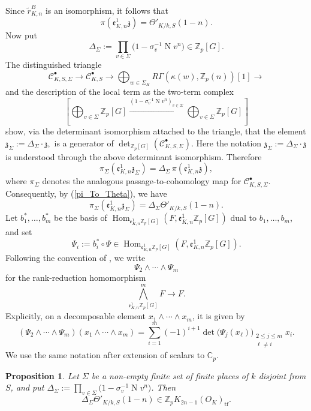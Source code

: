 \documentclass[a4paper,11pt]{article}
\newtheorem{proposition}[theorem]{Proposition}
\begin{document}
Since \(\widetilde r^B_{K,n}\) is an isomorphism, it follows that
\begin{equation}\label{pi_To_Theta}
\pi(\mathfrak e_{K,n}^1\mathfrak z)
=
\Theta'_{K/k,S}(1-n).
\end{equation}
Now put
\[
\Delta_{\Sigma}:=
\prod_{v\in\Sigma}
\bigl(1-\sigma_v^{-1}\operatorname N v^n\bigr)
\in \mathbb Z_p[G].
\]
The distinguished triangle
\[
\mathcal C_{K,S,\Sigma}^{\bullet}
\to
\mathcal C_{K,S}^{\bullet}
\to
\bigoplus_{w\in\Sigma_K}R\Gamma(\kappa(w),\mathbb Z_p(n))[1]
\to
\]
and the description of the local term as the two-term complex
\[
\left[
\bigoplus_{v\in\Sigma}\mathbb Z_p[G]
\stackrel{(1-\sigma_v^{-1}\operatorname N v^n)_{v\in\Sigma}}{\longrightarrow}
\bigoplus_{v\in\Sigma}\mathbb Z_p[G]
\right]
\]
show, via the determinant isomorphism attached to the triangle, that the
element
\(
\mathfrak z_{\Sigma}:=\Delta_{\Sigma}\cdot\mathfrak z,
\)
is a generator of
\(
\operatorname{det}_{\mathbb Z_p[G]}(\mathcal C_{K,S,\Sigma}^{\bullet}).
\)
Here the notation \(\mathfrak z_{\Sigma}:=\Delta_{\Sigma}\cdot\mathfrak z\) is
understood through the above determinant isomorphism. Therefore
\[
\pi_{\Sigma}(\mathfrak e_{K,n}^1\mathfrak z_{\Sigma})
=
\Delta_{\Sigma}\,
\pi(\mathfrak e_{K,n}^1\mathfrak z),
\]
where \(\pi_{\Sigma}\) denotes the analogous passage-to-cohomology map for
\(\mathcal C_{K,S,\Sigma}^{\bullet}\). Consequently, by (\ref{pi_To_Theta}), we have
\begin{equation}\label{pi_To_DeltaTheta}
\pi_{\Sigma}(\mathfrak e_{K,n}^1\mathfrak z_{\Sigma})
=
\Delta_{\Sigma}
\Theta'_{K/k,S}(1-n).
\end{equation}
 Let \(b_1^*,\ldots,b_m^*\) be the basis of
\(\operatorname{Hom}_{\mathfrak e^1_{K,n}\mathbb Z_p[G]}(F,\mathfrak e^1_{K,n}\mathbb Z_p[G])\) dual to \(b_1,\ldots,b_m\), and set
\[
\Psi_i:=b_i^*\circ \Psi\in \operatorname{Hom}_{\mathfrak e^1_{K,n}\mathbb Z_p[G]}(F,\mathfrak e^1_{K,n}\mathbb Z_p[G]).
\]
Following the convention of \cite[\S 4.1]{BKS0}, we write
\[
\Psi_2\wedge\cdots\wedge\Psi_m
\]
for the rank-reduction homomorphism
\[
\bigwedge_{\mathfrak e^1_{K,n}\mathbb Z_p[G]}^m F
\longrightarrow F.
\]
Explicitly, on a decomposable element \(x_1\wedge\cdots\wedge x_m\), it is
given by
\[
(\Psi_2\wedge\cdots\wedge\Psi_m)(x_1\wedge\cdots\wedge x_m)
=
\sum_{i=1}^m
(-1)^{i+1}
\det\bigl(\Psi_j(x_\ell)\bigr)_{\substack{2\leq j\leq m\\ \ell\neq i}}
x_i.
\]
We use the same notation after extension of scalars to \(\mathbb C_p\).
\begin{proposition}
\label{prop:Sigma-integrality-Theta-prime}
Let $\Sigma$ be a non-empty finite set of finite places of $k$ disjoint from
$S$, and put
\(
\Delta_{\Sigma}:=
\prod_{v\in\Sigma}
\bigl(1-\sigma_v^{-1}\operatorname N v^n\bigr)
\).
Then
\[
\Delta_{\Sigma}\Theta'_{K/k,S}(1-n)
\in
\mathbb Z_pK_{2n-1}(O_K)_{\mathrm{tf}}.
\]
\end{proposition}
\end{document}
